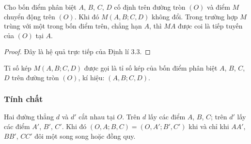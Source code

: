         \begin{theorem}
            Cho bốn điểm phân biệt \(A\), \(B\), \(C\), \(D\) cố định trên đường tròn \((O)\) và điểm \(M\) chuyển động trên \((O)\). Khi đó \(M(A,B;C,D)\) không đổi. Trong trường hợp \(M\) trùng với một trong bốn điểm trên, chẳng hạn \(A\), thì \(MA\) được coi là tiếp tuyến của \((O)\) tại \(A\).
        \end{theorem}

        \begin{proof}
            Đây là hệ quả trực tiếp của Định lí 3.3.
        \end{proof}

        \begin{definition}
            Tỉ số kép \(M(A,B;C,D)\) được gọi là tỉ số kép của bốn điểm phân biệt \(A\), \(B\), \(C\), \(D\) trên đường tròn \((O)\), kí hiệu: \((A,B;C,D)\).
        \end{definition}

    \subsubsection*{Tính chất}

        \begin{property}
            Hai đường thẳng \(d\) và \(d'\) cắt nhau tại \(O\). Trên \(d\) lấy các điểm \(A\), \(B\), \(C\); trên \(d'\) lấy các điểm \(A'\), \(B'\), \(C'\). Khi đó \((O,A;B,C) = (O,A';B',C')\) khi và chỉ khi \(AA'\), \(BB'\), \(CC'\) đôi một song song hoặc đồng quy.
        \end{property}

